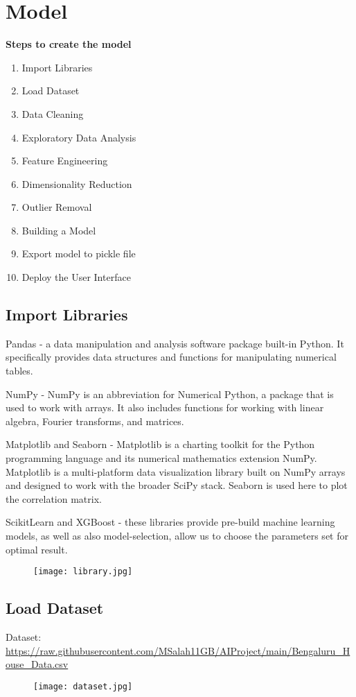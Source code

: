 \documentclass[a4paper, 12pt]{article}
\begin{document}
\section{Model}
\textbf{Steps to create the model}
\begin{enumerate}
    \item Import Libraries
    \item Load Dataset
    \item Data Cleaning
    \item Exploratory Data Analysis
    \item Feature Engineering
    \item Dimensionality Reduction
    \item Outlier Removal
    \item Building a Model
    \item Export model to pickle file
    \item Deploy the User Interface
\end{enumerate}
\subsection{Import Libraries} 

Pandas - a data manipulation and analysis software package built-in Python. It specifically provides data structures and functions for manipulating numerical tables.

NumPy - NumPy is an abbreviation for Numerical Python, a package that is used to work with arrays. It also includes functions for working with linear algebra, Fourier transforms, and matrices.

Matplotlib and Seaborn - Matplotlib is a charting toolkit for the Python programming language and its numerical mathematics extension NumPy. Matplotlib is a multi-platform data visualization library built on NumPy arrays and designed to work with the broader SciPy stack. Seaborn is used here to plot the correlation matrix.

ScikitLearn and XGBoost - these libraries provide pre-build machine learning models, as well as also model-selection, allow us to choose the parameters set for optimal result. 
\begin{figure}[tbh]
    \centering
    \texttt{[image: library.jpg]}
\end{figure}
\newpage
\subsection{Load Dataset}
Dataset: \url{https://raw.githubusercontent.com/MSalah11GB/AIProject/main/Bengaluru_House_Data.csv}
\begin{figure}[tbh]
    \centering
    \texttt{[image: dataset.jpg]}
\end{figure}
\end{document}
